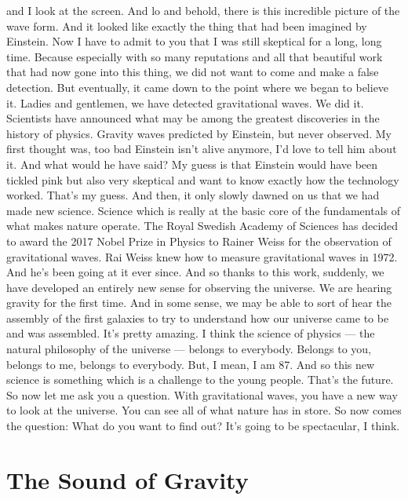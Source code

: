 \begin{itemize}
  and I look at the screen. And lo and behold, there is this incredible
  picture of the wave form. And it looked like exactly the thing that
  had been imagined by Einstein. Now I have to admit to you that I was
  still skeptical for a long, long time. Because especially with so many
  reputations and all that beautiful work that had now gone into this
  thing, we did not want to come and make a false detection. But
  eventually, it came down to the point where we began to believe it.
  Ladies and gentlemen, we have detected gravitational waves. We did it.
  Scientists have announced what may be among the greatest discoveries
  in the history of physics. Gravity waves predicted by Einstein, but
  never observed. My first thought was, too bad Einstein isn't alive
  anymore, I'd love to tell him about it. And what would he have said?
  My guess is that Einstein would have been tickled pink but also very
  skeptical and want to know exactly how the technology worked. That's
  my guess. And then, it only slowly dawned on us that we had made new
  science. Science which is really at the basic core of the fundamentals
  of what makes nature operate. The Royal Swedish Academy of Sciences
  has decided to award the 2017 Nobel Prize in Physics to Rainer Weiss
  for the observation of gravitational waves. Rai Weiss knew how to
  measure gravitational waves in 1972. And he's been going at it ever
  since. And so thanks to this work, suddenly, we have developed an
  entirely new sense for observing the universe. We are hearing gravity
  for the first time. And in some sense, we may be able to sort of hear
  the assembly of the first galaxies to try to understand how our
  universe came to be and was assembled. It's pretty amazing. I think
  the science of physics --- the natural philosophy of the universe ---
  belongs to everybody. Belongs to you, belongs to me, belongs to
  everybody. But, I mean, I am 87. And so this new science is something
  which is a challenge to the young people. That's the future. So now
  let me ask you a question. With gravitational waves, you have a new
  way to look at the universe. You can see all of what nature has in
  store. So now comes the question: What do you want to find out? It's
  going to be spectacular, I think.
\end{itemize}

\hypertarget{the-sound-of-gravity-1}{%
\section{The Sound of Gravity}\label{the-sound-of-gravity-1}}

